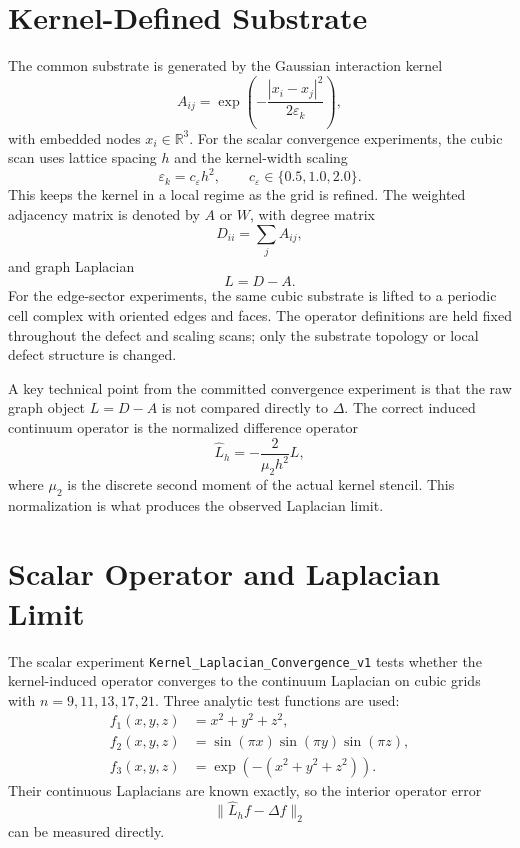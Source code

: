 \documentclass[11pt]{article}
\begin{document}
\section{Kernel-Defined Substrate}
The common substrate is generated by the Gaussian interaction kernel
\begin{equation}
A_{ij} = \exp\!\left(-\frac{|x_i-x_j|^2}{2\varepsilon_k}\right),
\end{equation}
with embedded nodes $x_i \in \mathbb{R}^3$. For the scalar convergence experiments, the cubic scan uses lattice spacing $h$ and the kernel-width scaling
\begin{equation}
\varepsilon_k = c_\varepsilon h^2,
\qquad
c_\varepsilon \in \{0.5, 1.0, 2.0\}.
\end{equation}
This keeps the kernel in a local regime as the grid is refined. The weighted adjacency matrix is denoted by $A$ or $W$, with degree matrix
\begin{equation}
D_{ii} = \sum_j A_{ij},
\end{equation}
and graph Laplacian
\begin{equation}
L = D - A.
\end{equation}
For the edge-sector experiments, the same cubic substrate is lifted to a periodic cell complex with oriented edges and faces. The operator definitions are held fixed throughout the defect and scaling scans; only the substrate topology or local defect structure is changed.

A key technical point from the committed convergence experiment is that the raw graph object $L = D-A$ is not compared directly to $\Delta$. The correct induced continuum operator is the normalized difference operator
\begin{equation}
\widehat{L}_h = -\frac{2}{\mu_2 h^2}L,
\end{equation}
where $\mu_2$ is the discrete second moment of the actual kernel stencil. This normalization is what produces the observed Laplacian limit.

\section{Scalar Operator and Laplacian Limit}
The scalar experiment \texttt{Kernel\_Laplacian\_Convergence\_v1} tests whether the kernel-induced operator converges to the continuum Laplacian on cubic grids with $n = 9, 11, 13, 17, 21$. Three analytic test functions are used:
\begin{align}
 f_1(x,y,z) &= x^2+y^2+z^2, \\
 f_2(x,y,z) &= \sin(\pi x)\sin(\pi y)\sin(\pi z), \\
 f_3(x,y,z) &= \exp\!\left(-(x^2+y^2+z^2)\right).
\end{align}
Their continuous Laplacians are known exactly, so the interior operator error
\begin{equation}
\|\widehat{L}_h f - \Delta f\|_2
\end{equation}
can be measured directly.
\end{document}
